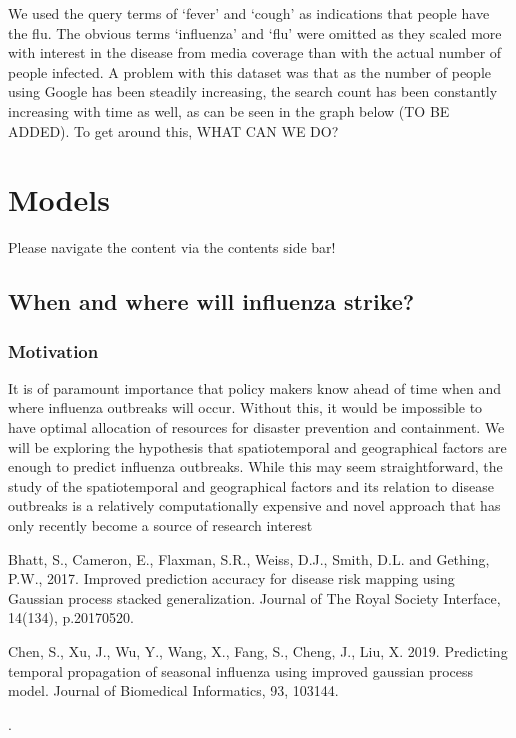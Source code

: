 \documentclass[letterpaper,10pt,english]{sphinxmanual}
\begin{document}
We used the query terms of ‘fever’ and ‘cough’ as indications that people have the flu. The obvious terms ‘influenza’ and ‘flu’ were omitted as they scaled more with interest in the disease from media coverage than with the actual number of people infected. A problem with this dataset was that as the number of people using Google has been steadily increasing, the search count has been constantly increasing with time as well, as can be seen in the graph below (TO BE ADDED). To get around this, WHAT CAN WE DO?


\section{Models}
\label{\detokenize{models:models}}\label{\detokenize{models::doc}}
Please navigate the content via the contents side bar!


\subsection{When and where will influenza strike?}
\label{\detokenize{models/when:when-and-where-will-influenza-strike}}\label{\detokenize{models/when:gp}}\label{\detokenize{models/when::doc}}

\subsubsection{Motivation}
\label{\detokenize{models/when:motivation}}
It is of paramount importance that policy makers know ahead of time when and where influenza outbreaks will occur. Without this, it would be impossible to have optimal allocation of resources for disaster prevention and containment. We will be exploring the hypothesis that spatiotemporal and geographical factors are enough to predict influenza outbreaks. While this may seem straightforward, the study of the spatiotemporal and geographical factors and its relation to disease outbreaks is a relatively computationally expensive and novel approach that has only recently become a source of research interest %
\begin{footnote}[1]\sphinxAtStartFootnote
Bhatt, S., Cameron, E., Flaxman, S.R., Weiss, D.J., Smith, D.L. and Gething, P.W., 2017. Improved prediction accuracy for disease risk mapping using Gaussian process stacked generalization. Journal of The Royal Society Interface, 14(134), p.20170520.
%
\end{footnote} %
\begin{footnote}[2]\sphinxAtStartFootnote
Chen, S., Xu, J., Wu, Y., Wang, X., Fang, S., Cheng, J., Liu, X. 2019. Predicting temporal propagation of seasonal influenza using improved gaussian process model. Journal of Biomedical Informatics, 93, 103144. 
%
\end{footnote}.
\end{document}

